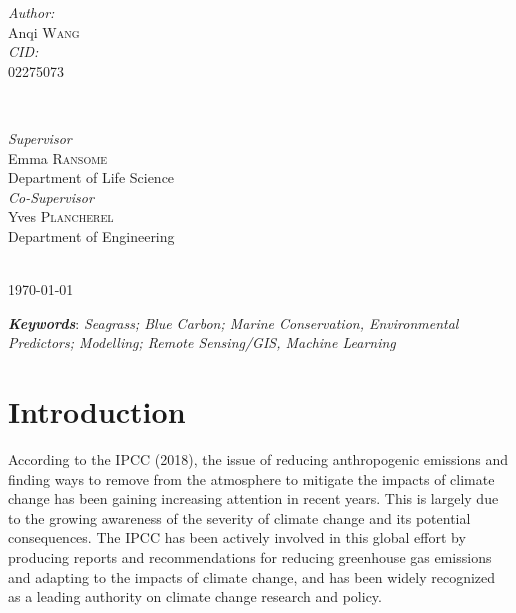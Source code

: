 \documentclass[a4paper]{report}
\begin{document}
\begin{titlepage}
\begin{minipage}{0.4\textwidth}
\begin{flushleft} \large
\emph{Author:}\\
Anqi \textsc{Wang} \\ 
\emph{CID:}\\
02275073
\end{flushleft}
\end{minipage}
~
\begin{minipage}{0.5\textwidth}
\begin{flushright} \large
\emph{Supervisor} \\
Emma \textsc{Ransome} \\
Department of Life Science\\
[0.5cm] \emph{Co-Supervisor} \\
Yves \textsc{ Plancherel}\\
Department of  Engineering\\

\end{flushright}
\end{minipage}\\[1cm]

{\large \today}\\[0.5cm] %

\vfill %

\end{titlepage}

\renewcommand{\abstractname}{Keywords}
\textbf{\textit{Keywords}}: \textit{Seagrass; Blue Carbon; Marine Conservation, Environmental Predictors; Modelling; Remote Sensing/GIS, Machine Learning}

\linenumbers
\section{Introduction}
According to the IPCC (2018), the issue of reducing anthropogenic  emissions and finding ways to remove  from the atmosphere to mitigate the impacts of climate change has been gaining increasing attention in recent years. This is largely due to the growing awareness of the severity of climate change and its potential consequences. The IPCC has been actively involved in this global effort by producing reports and recommendations for reducing greenhouse gas emissions and adapting to the impacts of climate change, and has been widely recognized as a leading authority on climate change research and policy.
\end{document}

